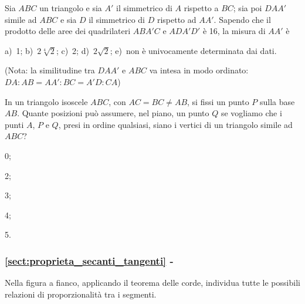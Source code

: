 \begin{esercizio}
\label{ese:6.97}
Sia \(ABC\) un triangolo e sia \(A'\) il simmetrico di \(A\) rispetto a 
\(BC\); sia poi \(DAA'\) simile ad \(ABC\) e sia \(D\) il simmetrico di \(D\) 
rispetto ad \(AA'\). Sapendo che il prodotto delle aree dei 
quadrilateri \(ABA'C\) e \(ADA'D'\) è 16, la misura di \(AA'\) è

\vspace{6pt}
a)~1; \quad b)~\(2\sqrt[4]{2}\); \quad c)~2; \quad d)~\(2\sqrt{2}\); \quad
e)~non è univocamente determinata dai dati.

\vspace{6pt}
\noindent (Nota: la similitudine tra \(DAA'\) e \(ABC\) va intesa in modo ordinato: 
\(DA : AB = AA':BC=A'D:CA\))
\end{esercizio}

\begin{esercizio}
\label{ese:6.98}
In un triangolo isoscele \(ABC\), con \(AC = BC \neq AB\), si fissi un 
punto \(P\) sulla base \(AB\). Quante posizioni può assumere, nel piano, 
un punto \(Q\) se vogliamo che i punti \(A\), \(P\) e \(Q\), presi in ordine 
qualsiasi, siano i vertici di un triangolo simile ad \(ABC\)?
\begin{multicols}{5}
\begin{enumeratea}
\item 0;
\item 2;
\item 3;
\item 4;
\item 5.
\end{enumeratea}
\end{multicols}
\end{esercizio}

\begingroup
\hypersetup{linkcolor=black}
\subsubsection*{\ref{sect:proprieta_secanti_tangenti} - 
}
\endgroup

\noindent\begin{minipage}{.5\textwidth}
\begin{esercizio}
\label{ese:6.99}
Nella figura a fianco, applicando il teorema delle corde, 
individua tutte le possibili relazioni di proporzionalità tra i 
segmenti.
\end{esercizio}
\end{minipage}
\begin{minipage}{.5\textwidth}
\begin{inaccessibleblock}
 \begin{center}  \end{center}
\end{inaccessibleblock}
\end{minipage}

